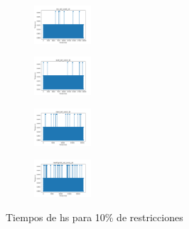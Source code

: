 \begin{figure}[H]
\begin{subfigure}
    \end{subfigure}
    \hfill
    \begin{subfigure}
        \centering
        \includegraphics[width=0.234\textwidth]{img/hs/iris_set_const_10_3773969821_time.png}
    \end{subfigure}
    \hfill
    \begin{subfigure}
        \centering
        \includegraphics[width=0.234\textwidth]{img/hs/ecoli_set_const_10_3773969821_time.png}
    \end{subfigure}
    \hfill
    \begin{subfigure}
        \centering
        \includegraphics[width=0.234\textwidth]{img/hs/rand_set_const_10_3773969821_time.png}
    \end{subfigure}
    \hfill
    \begin{subfigure}
        \centering
        \includegraphics[width=0.234\textwidth]{img/hs/newthyroid_set_const_10_3773969821_time.png}
    \end{subfigure}
    \caption{Tiempos de hs para 10\% de restricciones}
\end{figure}

\vspace*{\fill}
\newpage
\vspace*{\fill}


